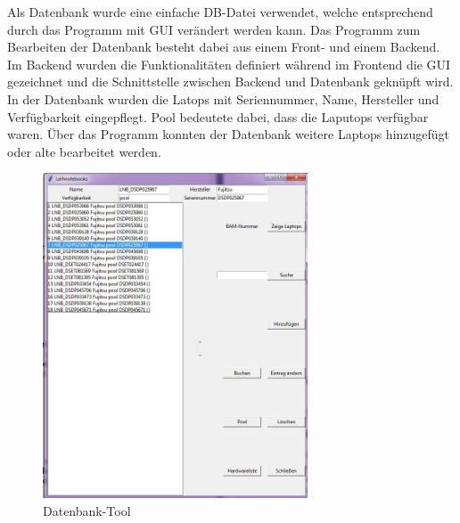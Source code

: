 \noindent
Als Datenbank wurde eine einfache DB-Datei verwendet, welche entsprechend durch das Programm mit GUI verändert werden kann. Das Programm zum Bearbeiten der Datenbank besteht dabei aus einem Front- und einem Backend. Im Backend wurden die Funktionalitäten definiert während im Frontend die GUI gezeichnet und die Schnittstelle zwischen Backend und Datenbank geknüpft wird. In der Datenbank wurden die Latops mit Seriennummer, Name, Hersteller und Verfügbarkeit eingepflegt. Pool bedeutete dabei, dass die Laputops verfügbar waren. Über das Programm konnten der Datenbank weitere Laptops hinzugefügt oder alte bearbeitet werden.
\begin{figure}[H] 
  \centering
     \includegraphics[width=0.7\textwidth]{frontend.jpg}
  \caption{Datenbank-Tool}
  \label{fig:Bild1}
\end{figure}

